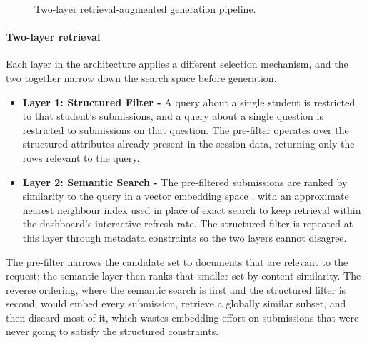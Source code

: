 \begin{figure}[H]
    \caption{Two-layer retrieval-augmented generation pipeline.}
    \label{fig: rag architecture}
\end{figure}


\paragraph{Two-layer retrieval}
Each layer in the architecture applies a different selection mechanism, and the two together narrow down the search space before generation.
\begin{itemize}
    \item \textbf{Layer 1: Structured Filter -} A query about a single student is restricted to that student's submissions, and a query about a single question is restricted to submissions on that question. The pre-filter operates over the structured attributes already present in the session data, returning only the rows relevant to the query.
    \item \textbf{Layer 2: Semantic Search -} The pre-filtered submissions are ranked by similarity to the query in a vector embedding space \cite{reimersSentenceBERTSentenceEmbeddings2019}, with an approximate nearest neighbour index \cite{malkovEfficientRobustApproximate2016} used in place of exact search to keep retrieval within the dashboard's interactive refresh rate. The structured filter is repeated at this layer through metadata constraints so the two layers cannot disagree.
\end{itemize}

The pre-filter narrows the candidate set to documents that are relevant to the request; the semantic layer then ranks that smaller set by content similarity.
The reverse ordering, where the semantic search is first and the structured filter is second, would embed every submission, retrieve a globally similar subset, and then discard most of it, which wastes embedding effort on submissions that were never going to satisfy the structured constraints.


